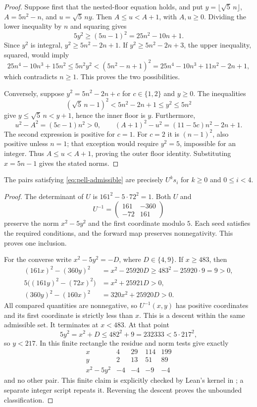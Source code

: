 \begin{proof}
Suppose first that the nested-floor equation holds, and put
$y=\lfloor\sqrt5\,n\rfloor$, $A=5n^2-n$, and $u=\sqrt5\,ny$.
Then $A\le u<A+1$, with $A,u\ge0$. Dividing the lower inequality by $n$
and squaring gives
\[
 5y^2\ge(5n-1)^2=25n^2-10n+1.
\]
Since $y^2$ is integral, $y^2\ge5n^2-2n+1$.
If $y^2\ge5n^2-2n+3$, the upper inequality, squared, would imply
\[
 25n^4-10n^3+15n^2\le5n^2y^2
 <(5n^2-n+1)^2
 =25n^4-10n^3+11n^2-2n+1,
\]
which contradicts $n\ge1$. This proves the two possibilities.

Conversely, suppose $y^2=5n^2-2n+c$ for $c\in\{1,2\}$ and $y\ge0$.
The inequalities
\[
 (\sqrt5\,n-1)^2<5n^2-2n+1\le y^2\le5n^2
\]
give $y\le\sqrt5\,n<y+1$, hence the inner floor is $y$.
Furthermore,
\[
 u^2-A^2=(5c-1)n^2>0,\qquad
 (A+1)^2-u^2=(11-5c)n^2-2n+1.
\]
The second expression is positive for $c=1$. For $c=2$ it is
$(n-1)^2$, also positive unless $n=1$; that exception would require
$y^2=5$, impossible for an integer. Thus $A\le u<A+1$, proving the
outer floor identity. Substituting $x=5n-1$ gives the stated norms.
\end{proof}

\begin{lemma}\label{lem:pell-descent}
The pairs satisfying \eqref{eq:pell-admissible} are precisely
$U^ks_i$ for $k\ge0$ and $0\le i<4$.
\end{lemma}

\begin{proof}
The determinant of $U$ is $161^2-5\cdot72^2=1$. Both $U$ and
\[
 U^{-1}=\begin{pmatrix}161&-360\\-72&161\end{pmatrix}
\]
preserve the norm $x^2-5y^2$ and the first coordinate modulo $5$.
Each seed satisfies the required conditions, and the forward map preserves
nonnegativity. This proves one inclusion.

For the converse write $x^2-5y^2=-D$, where $D\in\{4,9\}$.
If $x\ge483$, then
\begin{align*}
 (161x)^2-(360y)^2&=x^2-25920D
       \ge483^2-25920\cdot9=9>0,\\
 5\big((161y)^2-(72x)^2\big)&=x^2+25921D>0,\\
 (360y)^2-(160x)^2&=320x^2+25920D>0.
\end{align*}
All compared quantities are nonnegative, so
$U^{-1}(x,y)$ has positive coordinates and its first coordinate is
strictly less than $x$. This is a descent within the same admissible set.
It terminates at $x<483$. At that point
\[
 5y^2=x^2+D\le482^2+9=232333<5\cdot217^2,
\]
so $y<217$. In this finite rectangle the residue and norm tests give
exactly
\[
\begin{array}{c|rrrr}
 x&4&29&114&199\\
 y&2&13&51&89\\
 x^2-5y^2&-4&-4&-9&-4
\end{array}
\]
and no other pair. This finite claim is explicitly checked by Lean's
kernel in ; a separate integer script
repeats it. Reversing the descent proves the unbounded classification.
\end{proof}

